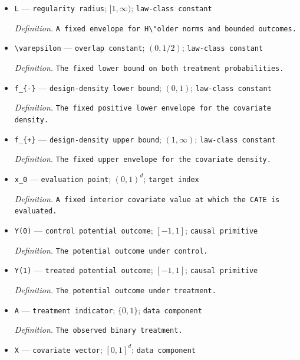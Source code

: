 \documentclass{article}
\begin{document}
\begin{itemize}
  \par\smallskip\noindent\emph{Definition.} \(s=(\alpha+\beta)/2\).
  \item \texttt{L} --- \texttt{regularity radius}; \([1,\infty)\); \texttt{law-\allowbreak{}class constant}
  \par\smallskip\noindent\emph{Definition.} \texttt{A fixed envelope for H\textbackslash{}\allowbreak{}"older norms and bounded outcomes.}
  \item \texttt{\textbackslash{}\allowbreak{}varepsilon} --- \texttt{overlap constant}; \((0,1/2)\); \texttt{law-\allowbreak{}class constant}
  \par\smallskip\noindent\emph{Definition.} \texttt{The fixed lower bound on both treatment probabilities.}
  \item \texttt{f\_\allowbreak{}\{-\allowbreak{}\}\allowbreak{}} --- \texttt{design-\allowbreak{}density lower bound}; \((0,1)\); \texttt{law-\allowbreak{}class constant}
  \par\smallskip\noindent\emph{Definition.} \texttt{The fixed positive lower envelope for the covariate density.}
  \item \texttt{f\_\allowbreak{}\{+\allowbreak{}\}\allowbreak{}} --- \texttt{design-\allowbreak{}density upper bound}; \((1,\infty)\); \texttt{law-\allowbreak{}class constant}
  \par\smallskip\noindent\emph{Definition.} \texttt{The fixed upper envelope for the covariate density.}
  \item \texttt{x\_\allowbreak{}0} --- \texttt{evaluation point}; \((0,1)^d\); \texttt{target index}
  \par\smallskip\noindent\emph{Definition.} \texttt{A fixed interior covariate value at which the CATE is evaluated.}
  \item \texttt{Y(0)} --- \texttt{control potential outcome}; \([-1,1]\); \texttt{causal primitive}
  \par\smallskip\noindent\emph{Definition.} \texttt{The potential outcome under control.}
  \item \texttt{Y(1)} --- \texttt{treated potential outcome}; \([-1,1]\); \texttt{causal primitive}
  \par\smallskip\noindent\emph{Definition.} \texttt{The potential outcome under treatment.}
  \item \texttt{A} --- \texttt{treatment indicator}; \(\{0,1\}\); \texttt{data component}
  \par\smallskip\noindent\emph{Definition.} \texttt{The observed binary treatment.}
  \item \texttt{X} --- \texttt{covariate vector}; \([0,1]^d\); \texttt{data component}

\end{itemize}
\end{document}
